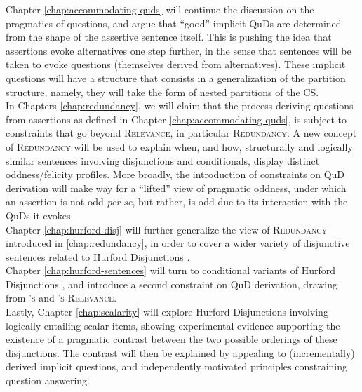 Chapter \ref{chap:accommodating-quds} will continue the discussion on the pragmatics of questions, and argue that ``good'' implicit QuDs are determined from the shape of the assertive sentence itself. This is pushing the idea that assertions evoke alternatives one step further, in the sense that sentences will be taken to evoke questions (themselves derived from alternatives). These implicit questions will have a structure that consists in a generalization of the partition structure, namely, they will take the form of nested partitions of the CS.\\

In Chapters \ref{chap:redundancy}, we will claim that the process deriving questions from assertions as defined in Chapter \ref{chap:accommodating-quds}, is subject to constraints that go beyond \textsc{Relevance}, in particular \textsc{Redundancy}. A new concept of \textsc{Redundancy} will be used to explain when, and how, structurally and logically similar sentences involving disjunctions and conditionals, display distinct oddness/felicity profiles. More broadly, the introduction of constraints on QuD derivation will make way for a ``lifted'' view of pragmatic oddness, under which an assertion is not odd \textit{per se}, but rather, is odd due to its interaction with the QuDs it evokes.\\

Chapter \ref{chap:hurford-disj} will further generalize the view of \textsc{Redundancy} introduced in \ref{chap:redundancy}, in order to cover a wider variety of disjunctive sentences related to Hurford Disjunctions \citep{Hurford1974}.\\

Chapter \ref{chap:hurford-sentences} will turn to conditional variants of Hurford Disjunctions \citep{Mandelkern2018}, and introduce a second constraint on QuD derivation, drawing from \textsc{\citeauthor{Lewis1988}'s} and \textsc{\citeauthor{Roberts2012}'s Relevance}.\\

Lastly, Chapter \ref{chap:scalarity} will explore Hurford Disjunctions involving logically entailing scalar items, showing experimental evidence supporting the existence of a pragmatic contrast between the two possible orderings of these disjunctions. The contrast will then be explained by appealing to (incrementally) derived implicit questions, and independently motivated principles constraining question answering. 






